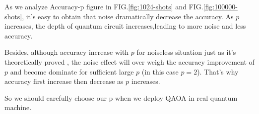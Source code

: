 As we analyze Accuracy-p figure in FIG.\ref{fig:1024-shots} and  FIG.\ref{fig:100000-shots}, it's easy to obtain that noise dramatically decrease the accuracy. As $p$ increases, the depth of quantum circuit increases,leading to more noise and less accuracy. 

Besides, although  accuracy increase with $p$ for noiseless situation just as it's theoretically proved , the noise effect will over weigh the accuracy improvement of $p$ and become dominate for sufficient large $p$ (in this case $p=2$). That's why accuracy first increase then decrease as $p$ increases.

So we should carefully choose our p when we deploy QAOA in real quantum machine.




    
    

    
    

